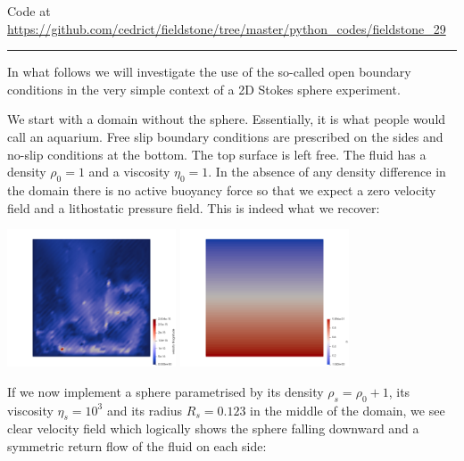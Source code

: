 

\begin{center}
Code at \url{https://github.com/cedrict/fieldstone/tree/master/python_codes/fieldstone_29}
\end{center}

\par\noindent\rule{\textwidth}{0.4pt}

\Literature \cite{chgv12}

In what follows we will investigate the use of the so-called open boundary conditions in 
the very simple context of a 2D Stokes sphere experiment. 


We start with a domain without the sphere. Essentially, it is what people would 
call an aquarium.
Free slip boundary conditions are prescribed on the sides and no-slip conditions at the bottom. 
The top surface is left free. The fluid has a density $\rho_0=1$ and a viscosity $\eta_0=1$.
In the absence of any density difference in the domain there is no active buoyancy force
so that we expect a zero velocity field and a lithostatic pressure field. 
This is indeed what we recover:  

\begin{center}
\includegraphics[width=5cm]{python_codes/fieldstone_29/results/aquarium/vel}
\includegraphics[width=5cm]{python_codes/fieldstone_29/results/aquarium/p}
\end{center}

If we now implement a sphere parametrised by its density $\rho_s=\rho_0+1$, its 
viscosity $\eta_s=10^3$ and its radius $R_s=0.123$ in the middle of the domain,  
we see clear velocity field which logically shows the sphere falling downward and 
a symmetric return flow of the fluid on each side:


